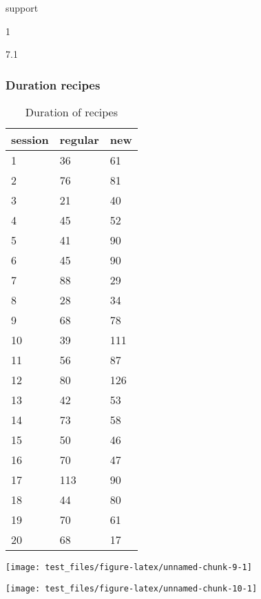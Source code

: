 \documentclass[]{article}
\begin{document}
support

1

{7.1}

\subsubsection{Duration recipes}\label{duration-recipes}

\begin{table}

\caption{\label{tab:unnamed-chunk-8}Duration of recipes}
\centering
\begin{tabular}[t]{l|l|l}
\hline
session & regular & new\\
\hline
\rowcolor{gray!6}  1 & 36 & 61\\
\hline
2 & 76 & 81\\
\hline
\rowcolor{gray!6}  3 & 21 & 40\\
\hline
4 & 45 & 52\\
\hline
\rowcolor{gray!6}  5 & 41 & 90\\
\hline
6 & 45 & 90\\
\hline
\rowcolor{gray!6}  7 & 88 & 29\\
\hline
8 & 28 & 34\\
\hline
\rowcolor{gray!6}  9 & 68 & 78\\
\hline
10 & 39 & 111\\
\hline
\rowcolor{gray!6}  11 & 56 & 87\\
\hline
12 & 80 & 126\\
\hline
\rowcolor{gray!6}  13 & 42 & 53\\
\hline
14 & 73 & 58\\
\hline
\rowcolor{gray!6}  15 & 50 & 46\\
\hline
16 & 70 & 47\\
\hline
\rowcolor{gray!6}  17 & 113 & 90\\
\hline
18 & 44 & 80\\
\hline
\rowcolor{gray!6}  19 & 70 & 61\\
\hline
20 & 68 & 17\\
\hline
\end{tabular}
\end{table}

\begin{center}\texttt{[image: test\_files/figure-latex/unnamed-chunk-9-1]} \end{center}

\begin{center}\texttt{[image: test\_files/figure-latex/unnamed-chunk-10-1]} \end{center}
\end{document}
